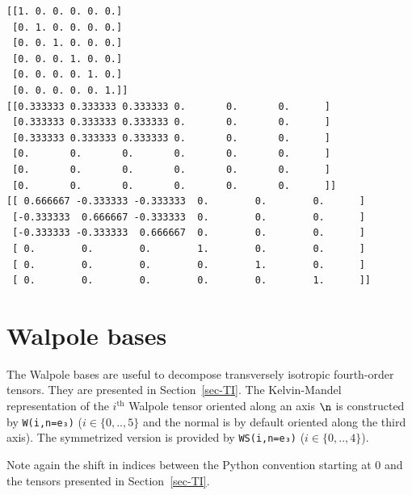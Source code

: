 \documentclass[
  letterpaper,
  DIV=11,
  numbers=noendperiod]{scrreprt}
\begin{document}
\begin{verbatim}
[[1. 0. 0. 0. 0. 0.]
 [0. 1. 0. 0. 0. 0.]
 [0. 0. 1. 0. 0. 0.]
 [0. 0. 0. 1. 0. 0.]
 [0. 0. 0. 0. 1. 0.]
 [0. 0. 0. 0. 0. 1.]]
[[0.333333 0.333333 0.333333 0.       0.       0.      ]
 [0.333333 0.333333 0.333333 0.       0.       0.      ]
 [0.333333 0.333333 0.333333 0.       0.       0.      ]
 [0.       0.       0.       0.       0.       0.      ]
 [0.       0.       0.       0.       0.       0.      ]
 [0.       0.       0.       0.       0.       0.      ]]
[[ 0.666667 -0.333333 -0.333333  0.        0.        0.      ]
 [-0.333333  0.666667 -0.333333  0.        0.        0.      ]
 [-0.333333 -0.333333  0.666667  0.        0.        0.      ]
 [ 0.        0.        0.        1.        0.        0.      ]
 [ 0.        0.        0.        0.        1.        0.      ]
 [ 0.        0.        0.        0.        0.        1.      ]]
\end{verbatim}

\section{Walpole bases}\label{walpole-bases}

The Walpole bases are useful to decompose transversely isotropic
fourth-order tensors. They are presented in Section~\ref{sec-TI}. The
Kelvin-Mandel representation of the \(i^\textrm{th}\) Walpole tensor
oriented along an axis \(\n\) is constructed by \texttt{W(i,n=e₃)}
(\(i \in \{0,..,5\}\) and the normal is by default oriented along the
third axis). The symmetrized version is provided by \texttt{WS(i,n=e₃)}
(\(i \in \{0,..,4\}\)).

\begin{tcolorbox}[enhanced jigsaw, left=2mm, bottomrule=.15mm, colbacktitle=quarto-callout-warning-color!10!white, colback=white, colframe=quarto-callout-warning-color-frame, rightrule=.15mm, bottomtitle=1mm, toptitle=1mm, titlerule=0mm, title=\textcolor{quarto-callout-warning-color}{\faExclamationTriangle}\hspace{0.5em}{Warning}, toprule=.15mm, arc=.35mm, opacityback=0, opacitybacktitle=0.6, leftrule=.75mm, breakable, coltitle=black]

Note again the shift in indices between the Python convention starting
at 0 and the tensors presented in Section~\ref{sec-TI}.

\end{tcolorbox}
\end{document}
